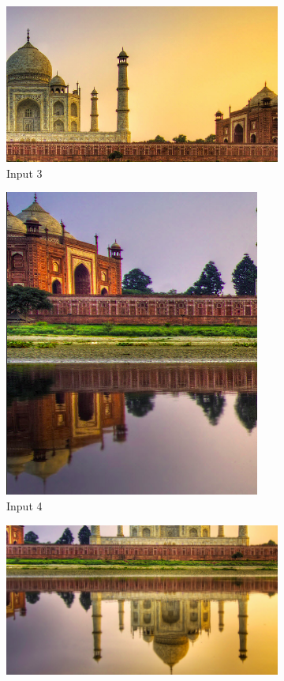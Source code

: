 \documentclass[a4paper,11]{article}
\begin{document}
      \begin{figure}\ContinuedFloat
      \begin{subfigure}{0.5\textwidth}
	\centering
	\includegraphics[width=.8\linewidth]{img2_3}
	\caption{Input 3}
      \end{subfigure}
      \begin{subfigure}{0.5\textwidth}
	\centering
	\includegraphics[width=.8\linewidth]{img2_4}
	\caption{Input 4}
      \end{subfigure}
      \begin{subfigure}{0.5\textwidth}
	\centering
	\includegraphics[width=.8\linewidth]{img2_5}

\end{subfigure}
\end{figure}
\end{document}
